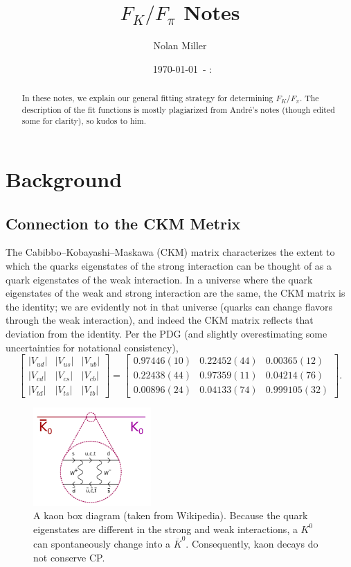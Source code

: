 \documentclass[prd,tightenlines,preprintnumbers,showpacs,superscriptaddress,notitlepage,eqsecnum,floatfix,notitlepage]{revtex4-1}
\newcommand{\mydate}{\ \today \ - \number\hour :\number\minute}
\begin{document}
\title{$F_K / F_\pi$ Notes}
\author{Nolan Miller}
\date{\mydate}


\begin{abstract}
In these notes, we explain our general fitting strategy for determining $F_K / F_\pi$. The description of the fit functions is mostly plagiarized from André's notes (though edited some for clarity), so kudos to him.
\end{abstract}
\maketitle

\section{Background}
\subsection{Connection to the CKM Metrix}
The Cabibbo–Kobayashi–Maskawa (CKM) matrix characterizes the extent to which the quarks eigenstates of the strong interaction can be thought of as a quark eigenstates of the weak interaction. In a universe where the quark eigenstates of the weak and strong interaction are the same, the CKM matrix is the identity; we are evidently not in that universe (quarks can change flavors through the weak interaction), and indeed the CKM matrix reflects that deviation from the identity. Per the PDG \cite{PhysRevD.98.030001} (and slightly overestimating some uncertainties for notational consistency),
\begin{equation}
\begin{bmatrix}
|V_{ud}| & |V_{us}| & |V_{ub}| \\
|V_{cd}| & |V_{cs}| & |V_{cb}| \\
|V_{td}| & |V_{ts}| & |V_{tb}|
\end{bmatrix} = \begin{bmatrix}
0.97446(10) & 0.22452(44) & 0.00365(12) \\
0.22438(44) & 0.97359(11) & 0.04214(76) \\
0.00896(24) & 0.04133(74) & 0.999105(32)
\end{bmatrix}.
\end{equation}

\begin{figure}
	\includegraphics[width=0.4\textwidth]{./../figs/kaon_box_diagram.png}
	\caption{A kaon box diagram  (taken from Wikipedia). Because the quark eigenstates are different in the strong and weak interactions, a $K^0$ can spontaneously change into a $\overline{K}^0$. Consequently, kaon decays do not conserve CP.}
\end{figure}
\end{document}
